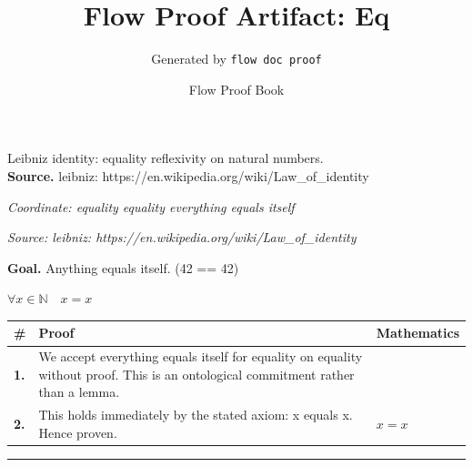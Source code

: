 \documentclass[11pt]{article}
\title{Flow Proof Artifact: Eq}
\author{Generated by \texttt{flow doc proof}}
\date{Flow Proof Book}
\theoremstyle{definition}
\begin{document}
\maketitle
Leibniz identity: equality reflexivity on natural numbers.\\[0.5em]
\textbf{Source.} leibniz: https://en.wikipedia.org/wiki/Law\_of\_identity\\[0.5em]
\bigskip
{}\par
\smallskip\noindent\textit{Coordinate: equality \cdot equality \cdot everything equals itself}\par
\smallskip\noindent\textit{Source: leibniz: https://en.wikipedia.org/wiki/Law\_of\_identity}\par
\medskip
\noindent\textbf{Goal.} Anything equals itself.  (42 == 42)\par
\noindent$\displaystyle \forall x \in \mathbb{N}\quad x = x$\par
\medskip
\noindent
\begin{tabular}{@{} >{\raggedright\arraybackslash}p{} >{\raggedright\arraybackslash}p{} >{\raggedleft\arraybackslash}p{} @{}}
\textbf{\#} & \textbf{Proof} & \textbf{Mathematics} \\
\midrule
\textbf{1.} & We accept everything equals itself for equality on equality without proof. This is an ontological commitment rather than a lemma. & \\[0.45em]
\textbf{2.} & This holds immediately by the stated axiom: x equals x. Hence proven. & $\displaystyle x = x$ \\[0.45em]
\bottomrule
\end{tabular}
\label{thm:Eq-equality-everything_equals_itself}
\par\medskip\hrule
\end{document}
